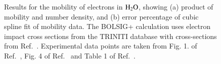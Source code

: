 \documentclass{warpdoc}
\let\citen\cite
\begin{document}
%
\begin{figure}
\centering
{}
\caption{Results for the mobility of electrons in ${\rm H_2O}$, showing (a) product of mobility and number density, and (b) error percentage of cubic spline fit of  mobility data. The BOLSIG+ calculation uses electron impact cross sections from the TRINITI database with cross-sections from Ref.\ \citen{phig:1987:yousfi}. Experimental data points are taken from Fig. 1. of Ref.\ \cite{jop:2007:hasegawa}, Fig. 4 of Ref.\ \cite{pra:1988:ness} and Table 1 of Ref.\ \cite{ajp:1990:cheung}.}
\label{fig:mobility_H2O}
\end{figure}
%
\end{document}
